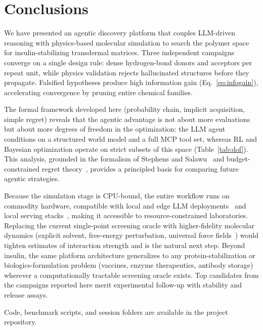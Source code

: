 \documentclass[twocolumn]{fairmeta}
\begin{document}
\section{Conclusions}

We have presented an agentic discovery platform that couples LLM-driven reasoning with physics-based molecular simulation to search the polymer space for insulin-stabilizing transdermal matrices.
Three independent campaigns converge on a single design rule: dense hydrogen-bond donors and acceptors per repeat unit, while physics validation rejects hallucinated structures before they propagate.
Falsified hypotheses produce high information gain (Eq.~\ref{eq:infogain}), accelerating convergence by pruning entire chemical families.

The formal framework developed here (probability chain, implicit acquisition, simple regret) reveals that the agentic advantage is not about more evaluations but about more degrees of freedom in the optimization: the LLM agent conditions on a structured world model and a full MCP tool set, whereas RL and Bayesian optimization operate on strict subsets of this space (Table~\ref{tab:dof}).
This analysis, grounded in the formalism of Stephens and Salawu~\cite{stephens2025mathframing} and budget-constrained regret theory~\cite{shahriari2016bayesopt}, provides a principled basis for comparing future agentic strategies.

Because the simulation stage is CPU-bound, the entire workflow runs on commodity hardware, compatible with local and edge LLM deployments~\cite{xu2024ondevice,qu2024mobileedge} and local serving stacks~\cite{ollama2023}, making it accessible to resource-constrained laboratories.
Replacing the current single-point screening oracle with higher-fidelity molecular dynamics (explicit solvent, free-energy perturbation, universal force fields~\cite{wood2025uma}) would tighten estimates of interaction strength and is the natural next step.
Beyond insulin, the same platform architecture generalizes to any protein-stabilization or biologics-formulation problem (vaccines, enzyme therapeutics, antibody storage) wherever a computationally tractable screening oracle exists.
Top candidates from the campaigns reported here merit experimental follow-up with stability and release assays.

Code, benchmark scripts, and session folders are available in the project repository.
\end{document}

